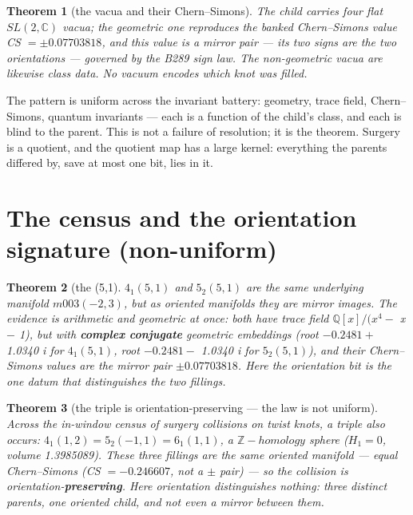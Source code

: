 \documentclass[11pt]{article}
\theoremstyle{plain}
\newtheorem{theorem}{Theorem}[section]
\theoremstyle{definition}
\theoremstyle{remark}
\begin{document}
\begin{theorem}[the vacua and their Chern–Simons]
The child carries four flat \(SL(2,\mathbb{C})\) vacua; the geometric one reproduces the banked Chern–Simons value CS \(= \pm 0.07703818\), and this value is a mirror pair — its two signs are the two orientations — governed by the B289 sign law. The non-geometric vacua are likewise class data. No vacuum encodes which knot was filled.
\end{theorem}

The pattern is uniform across the invariant battery: geometry, trace field, Chern–Simons, quantum invariants — each is a function of the child's class, and each is blind to the parent. This is not a failure of resolution; it is the theorem. Surgery is a quotient, and the quotient map has a large kernel: everything the parents differed by, save at most one bit, lies in it.

\section{The census and the orientation signature (non-uniform)}

\begin{theorem}[the (5,1]
\(4_{1}(5,1)\) and \(5_{2}(5,1)\) are the same underlying manifold \(m003(-2,3)\), but as \emph{oriented} manifolds they are mirror images. The evidence is arithmetic and geometric at once: both have trace field \(\mathbb{Q}[x]/(x^{4} -\) x \(-\) 1), but with \textbf{complex conjugate} geometric embeddings (root \(-0.2481 +\) 1.0340 i for \(4_{1}(5,1)\), root \(-0.2481 -\) 1.0340 i for \(5_{2}(5,1)\)), and their Chern–Simons values are the mirror pair \(\pm 0.07703818\). Here the orientation bit is the one datum that distinguishes the two fillings.
\end{theorem}

\begin{theorem}[the triple is orientation-preserving — the law is not uniform]
Across the in-window census of surgery collisions on twist knots, a \emph{triple} also occurs: \(4_{1}(1,2) = 5_{2}(-1,1) = 6_{1}(1,1)\), a \(\mathbb{Z}-homology\) sphere (\(H_{1} = 0\), volume 1.3985089). These three fillings are the \emph{same oriented} manifold — equal Chern–Simons (CS \(= -0.246607\), not a \(\pm \) pair) — so the collision is orientation-\textbf{preserving}. Here orientation distinguishes nothing: three distinct parents, one oriented child, and not even a mirror between them.
\end{theorem}
\end{document}
